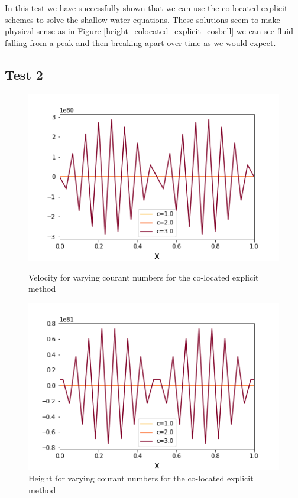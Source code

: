 \documentclass[a4paper,12pt, notitlepage]{article}
\begin{document}
In this test we have successfully shown that we can use the co-located explicit schemes to solve the shallow water equations. These solutions seem to make physical sense as in Figure \ref{height_colocated_explicit_cosbell} we can see fluid falling from a peak and then breaking apart over time as we would expect.

\subsection{Test 2}\label{sectiontest2}

\begin{figure} [H]
	\begin{minipage}{.5\textwidth}
		\ContinuedFloat*
		\captionsetup{width=0.9\textwidth}
		\captionsetup{justification=centering}
		\includegraphics[width=\textwidth]{velocity_varying_courant_explicit.png}
		\caption{\label{velocity_varying_courant_explicit} Velocity for varying courant numbers for the co-located explicit method} 
	\end{minipage}
	\begin{minipage}{.5\textwidth}
		\ContinuedFloat
		\captionsetup{width=0.9\textwidth}
		\captionsetup{justification=centering}
		\includegraphics[width=\textwidth]{height_varying_courant_explicit.png}
		\caption{\label{height_varying_courant_explicit} Height for varying courant numbers for the co-located explicit method} 
	\end{minipage}
\end{figure}
\end{document}
